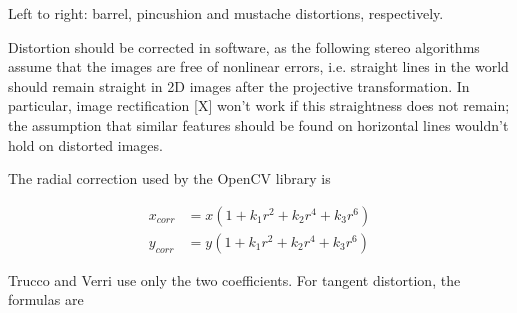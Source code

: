 {Left to right: barrel, pincushion and mustache distortions, respectively.}

Distortion should be corrected in software, as the following stereo algorithms assume that the images are free of nonlinear errors, i.e. straight lines in the world should remain straight in 2D images after the projective transformation.
In particular, image rectification [X] won't work if this straightness does not remain; the assumption that similar features should be found on horizontal lines wouldn't hold on distorted images.

The radial correction used by the OpenCV library is

\begin{align}
	x_{corr} &= x(1 + k_1 r^2 + k_2 r^4 + k_3 r^6)\\
	y_{corr} &= y(1 + k_1 r^2 + k_2 r^4 + k_3 r^6)
\end{align}

Trucco and Verri \cite{trucco1998introductory} use only the two coefficients. For tangent distortion, the formulas are

